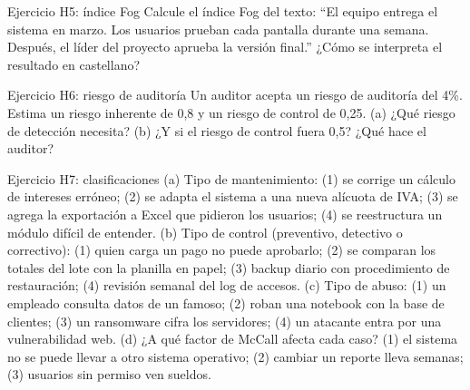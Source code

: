 \documentclass[11pt,a4paper]{article}
\begin{document}
\begin{enunciado}{Ejercicio H5: índice Fog}
Calcule el índice Fog del texto: ``El equipo entrega el sistema en marzo. Los usuarios prueban cada pantalla
durante una semana. Después, el líder del proyecto aprueba la versión final.'' ¿Cómo se interpreta el resultado
en castellano?
\end{enunciado}
\begin{enunciado}{Ejercicio H6: riesgo de auditoría}
Un auditor acepta un riesgo de auditoría del 4\%. Estima un riesgo inherente de 0,8 y un riesgo de control de
0,25. (a) ¿Qué riesgo de detección necesita? (b) ¿Y si el riesgo de control fuera 0,5? ¿Qué hace el auditor?
\end{enunciado}
\begin{enunciado}{Ejercicio H7: clasificaciones}
(a) Tipo de mantenimiento: (1) se corrige un cálculo de intereses erróneo; (2) se adapta el sistema a una nueva
alícuota de IVA; (3) se agrega la exportación a Excel que pidieron los usuarios; (4) se reestructura un módulo
difícil de entender. (b) Tipo de control (preventivo, detectivo o correctivo): (1) quien carga un pago no puede
aprobarlo; (2) se comparan los totales del lote con la planilla en papel; (3) backup diario con procedimiento de
restauración; (4) revisión semanal del log de accesos. (c) Tipo de abuso: (1) un empleado consulta datos de un
famoso; (2) roban una notebook con la base de clientes; (3) un ransomware cifra los servidores; (4) un atacante
entra por una vulnerabilidad web. (d) ¿A qué factor de McCall afecta cada caso? (1) el sistema no se puede llevar
a otro sistema operativo; (2) cambiar un reporte lleva semanas; (3) usuarios sin permiso ven sueldos.
\end{enunciado}

\end{document}
